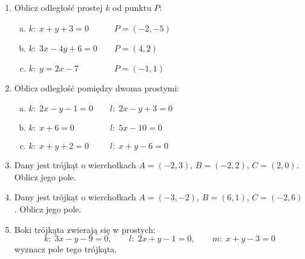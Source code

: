 \documentclass[12pt,a4paper]{article}
\begin{document}
	\newpage
	\begin{enumerate}[1.]

	\item Oblicz odległość prostej $k$ od punktu $P$:
	
	\begin{enumerate}[a)] 
		\item $k: \; x+y+3=0 \qquad \quad P=(-2,-5)$
		\item $k: \; 3x-4y+6=0 \qquad P=(4,2)$
		\item $k: \; y=2x-7 \:\qquad \qquad P=(-1,1)$
	 \end{enumerate}

		\item Oblicz odległość pomiędzy dwoma prostymi:
		
	\begin{enumerate}[a)] 
		\item $k: \; 2x-y-1=0 \qquad l:\; 2x-y+3=0\; $
		\item $k: \; x+6=0 \qquad \qquad\ l:\; 5x-10=0$
		\item $k: \; x+y+2=0 \qquad\ \;  l:\; x+y-6=0$
	\end{enumerate}

	\item Dany jest trójkąt o wierchołkach $A=(-2,3)$, $B=(-2,2)$, $C=(2,0)$. Oblicz jego pole.
	
	\item Dany jest trójkąt o wierchołkach $A=(-3,-2)$, $B=(6,1)$, $C=(-2,6)$. Oblicz jego pole.
	
	\item Boki trójkąta zwierają się w prostych:
	$$k:\; 3x-y-9=0, \qquad l:\; 2x+y-1=0, \qquad m:\; x+y-3=0$$	wyznacz pole tego trójkąta.
	\end{enumerate}
\end{document}
